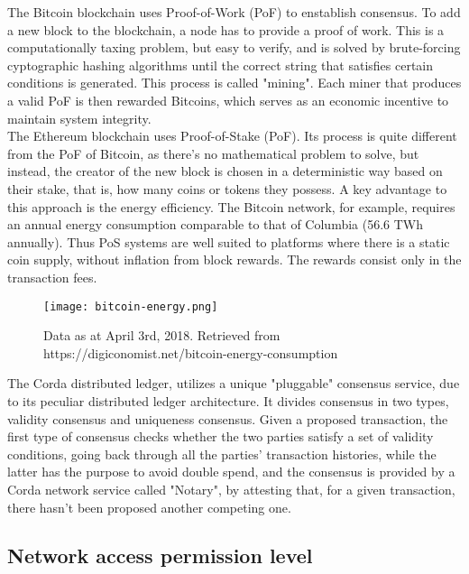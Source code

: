 The Bitcoin blockchain uses Proof-of-Work (PoF) to enstablish consensus. To add a new block to the blockchain, a node has to provide a proof of work. This is a computationally taxing problem, but easy to verify, and is solved by brute-forcing cyptographic hashing algorithms until the correct string that satisfies certain conditions is generated. This process is called "mining". Each miner that produces a valid PoF is then rewarded Bitcoins, which serves as an economic incentive to maintain system integrity. \\

The Ethereum blockchain uses Proof-of-Stake (PoF). Its process is quite different from the PoF of Bitcoin, as there's no mathematical problem to solve, but instead, the creator of the new block is chosen in a deterministic way based on their stake, that is, how many coins or tokens they possess. 
A key advantage to this approach is the energy efficiency. The Bitcoin network, for example, requires an annual energy consumption comparable to that of Columbia (56.6 TWh annually). 
Thus PoS systems are well suited to platforms where there is a static coin supply, without inflation from block rewards. The rewards consist only in the transaction fees. \\

\begin{figure}[h]
    \centering
    \texttt{[image: bitcoin-energy.png]}
    \caption{
        Data as at April 3rd, 2018. Retrieved from https://digiconomist.net/bitcoin-energy-consumption}
\end{figure}

The Corda distributed ledger, utilizes a unique "pluggable" consensus service, due to its peculiar distributed ledger architecture. It divides consensus in two types, validity consensus and uniqueness consensus. Given a proposed transaction, the first type of consensus checks whether the two parties satisfy a set of validity conditions, going back through all the parties' transaction histories, while the latter has the purpose to avoid double spend, and the consensus is provided by a Corda network service called "Notary", by attesting that, for a given transaction, there hasn't been proposed another competing one.\\


\subsection{Network access permission level}

